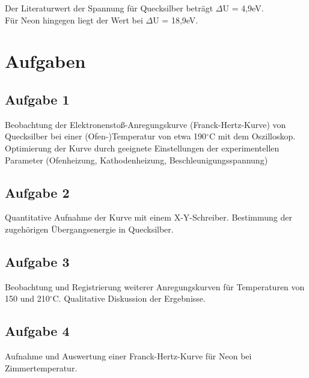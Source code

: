 \documentclass{article}
\begin{document}
{\begin{center}
\begin{minipage}{\linewidth}
\centering
{}
%
\label{verlauf}
\end{minipage}
\end{center}


Der Literaturwert der Spannung für Quecksilber beträgt \(\Delta\)U = 4,9eV.\\
Für Neon hingegen liegt der Wert bei \(\Delta\)U = 18,9eV.

\newpage
\section{Aufgaben}
\subsection*{Aufgabe 1}
Beobachtung der Elektronenstoß-Anregungskurve (Franck-Hertz-Kurve) von Quecksilber bei einer (Ofen-)Temperatur von etwa 190\(^\circ\)C mit dem Oszilloskop. Optimierung der Kurve durch geeignete Einstellungen der experimentellen Parameter (Ofenheizung, Kathodenheizung, Beschleunigungsspannung)

\subsection*{Aufgabe 2}
Quantitative Aufnahme der Kurve mit einem X-Y-Schreiber. Bestimmung der zugehörigen Übergangsenergie in Quecksilber.

\subsection*{Aufgabe 3}
Beobachtung und Registrierung weiterer Anregungskurven für Temperaturen von 150 und 210\(^\circ\)C. Qualitative Diskussion der Ergebnisse.

\subsection*{Aufgabe 4}
Aufnahme und Auswertung einer Franck-Hertz-Kurve für Neon bei Zimmertemperatur.

}
\end{document}
